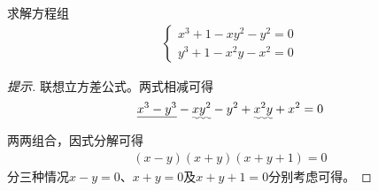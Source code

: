 \begin{example}[德国竞赛题]
  求解方程组
  \begin{align*}
    \begin{cases}
      x^3 + 1 - xy^2 - y^2 = 0\\
      y^3 + 1 - x^2y - x^2 = 0
    \end{cases}
  \end{align*}
\end{example}
\begin{proof}[提示]
  联想立方差公式。两式相减可得
  \begin{align*}
    \underline{x^3 - y^3} - \uwave{xy^2} - y^2 + \uwave{x^2y} + x^2 = 0
  \end{align*}
  两两组合，因式分解可得
  \begin{align*}
    (x-y)(x+y)(x+y+1)=0
  \end{align*}
  分三种情况$x-y=0$、$x+y=0$及$x+y+1=0$分别考虑可得。
\end{proof}
